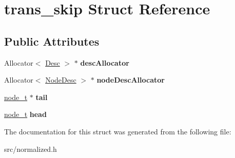 \hypertarget{structtrans__skip}{}\section{trans\+\_\+skip Struct Reference}
\label{structtrans__skip}
\subsection*{Public Attributes}
\begin{DoxyCompactItemize}
\item 
\mbox{\label{structtrans__skip_a7bd5096f4e55a68c1a236daa3fa41404}} 
Allocator$<$ \mbox{\hyperlink{structDesc}{Desc}} $>$ $\ast$ {\bfseries desc\+Allocator}
\item 
\mbox{\label{structtrans__skip_ac7306fc6b2482c73b573af62357490c3}} 
Allocator$<$ \mbox{\hyperlink{structNodeDesc}{Node\+Desc}} $>$ $\ast$ {\bfseries node\+Desc\+Allocator}
\item 
\mbox{\label{structtrans__skip_a8b83e966c26cafbacb33d797167e823b}} 
\mbox{\hyperlink{structnode__t}{node\+\_\+t}} $\ast$ {\bfseries tail}
\item 
\mbox{\label{structtrans__skip_af0d0d3b556f1dd198c3a7c55410e51f0}} 
\mbox{\hyperlink{structnode__t}{node\+\_\+t}} {\bfseries head}
\end{DoxyCompactItemize}


The documentation for this struct was generated from the following file\+:\begin{DoxyCompactItemize}
\item 
src/normalized.\+h\end{DoxyCompactItemize}
